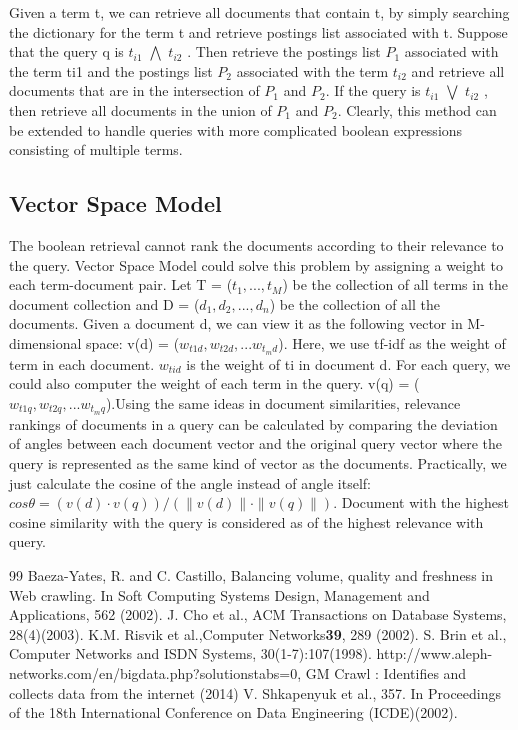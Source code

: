 \documentclass{article}
\begin{document}
Given a term t, we can retrieve all documents that contain t, by simply searching the dictionary
for the term t and retrieve postings list associated with t. Suppose that the query q is $t_{i1}$ $\bigwedge$ $t_{i2}$ . Then retrieve the postings list $P_1$ associated with the term ti1 and the postings list $P_2$ associated with the term $t_{i2}$ and retrieve all documents that are
in the intersection of $P_1$ and $P_2$. If the query is $t_{i1}$ $\bigvee$ $t_{i2}$ , then retrieve all documents in the union of
$P_1$ and $P_2$. Clearly, this method can be extended to handle queries with more complicated boolean
expressions consisting of multiple terms.\\
\subsection{Vector Space Model}
The boolean retrieval cannot rank the documents according to their relevance to the query. Vector Space Model could solve this problem by assigning a weight to each term-document pair. Let T = (${t_1, ..., t_M}$) be the collection of all terms in the document collection and D = ($d_1, d_2, ... , d_n$) be the collection of all the documents. Given a document d, we can view it as the following vector in M-dimensional space:
v(d) = (${w_{t1d}, w_{t2d}, ... w_{t_md}}$). Here, we use tf-idf as the weight of term in each document. $w_{tid}$ is the weight of ti in document d. For each query, we could also computer the weight of each term in the query. v(q) = (${w_{t1q}, w_{t2q}, ... w_{t_mq}}$).Using the same ideas in document similarities, relevance rankings of documents in a query can be calculated by comparing the deviation of angles between each document vector and the original query vector where the query is represented as the same kind of vector as the documents. Practically, we just calculate the cosine of the angle instead of angle itself: $cos\theta=(v(d)\cdot v(q))/(\|v(d)\|\cdot\|v(q)\| )$. Document with the highest cosine similarity with the query is considered as of the highest relevance with query.\\

\begin {thebibliography}{99}
Baeza-Yates, R. and C. Castillo, Balancing volume, quality and freshness in Web crawling. In Soft Computing Systems Design, Management and Applications, 562 (2002).
J. Cho et al., ACM Transactions on Database Systems, 28(4)(2003).
K.M. Risvik et al.,Computer Networks\textbf{39}, 289 (2002).
S. Brin et al., Computer Networks and ISDN Systems, 30(1-7):107(1998).
http://www.aleph-networks.com/en/bigdata.php?solutionstabs=0, GM Crawl : Identifies and collects data from the internet (2014)
V. Shkapenyuk et al., 357. In Proceedings of the 18th International Conference on Data Engineering (ICDE)(2002).





\end {thebibliography}
\end{document}
